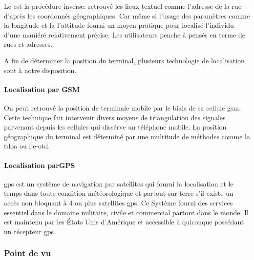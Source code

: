 Le  est la procédure inverse: retrouvé les lieux textuel comme l'adresse de la rue d'après les coordonnés géographiques. Car même si l'usage des paramètres comme la longitude et la l'attitude fourni un moyen pratique pour localisé l'individu d'une maniéré relativement précise. Les utilisateurs penche à pensés en terme de rues et adresses.

A fin de déterminer la position du terminal, plusieurs technologie de localisation sont à notre disposition.

\paragraph[Localisation par GSM]{Localisation par GSM}
On peut retrouvé la position de terminale mobile par le biais de sa cellule \gls{gsm}. Cette technique fait intervenir divers moyens de triangulation des signales parvenant depuis les cellules qui dissérve un téléphone mobile. La position géographique du terminal est déterminé par une multitude de méthodes comme la \gls{tdoa} ou l'\gls{e-otd}.

\paragraph[Localisation parGPS]{Localisation parGPS\cite{enig:gps}}
\gls{gps} est un système de navigation par satellites qui fourni la localisation et le temps dans toute condition météorologique et partout sur terre s'il existe un accès non bloquant à 4 ou plus satellites \gls{gps}. Ce Système fourni des services essentiel dans le domaine militaire, civile et commercial partout dans le monde. Il est maintenu par les États Unis d'Amérique et accessible à quiconque possédant un récepteur \gls{gps}.

\subsubsection[Point de vu \android{}]{Point de vu \android{}\cite{pa4ad:chptr13}}

